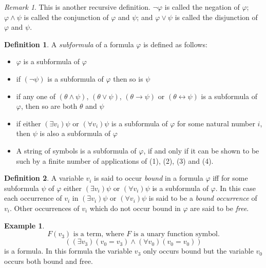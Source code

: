 \documentclass[titlepage, oneside]{amsbook}
\theoremstyle{plain}
\theoremstyle{definition}
\newtheorem{examples}{Example}
\newtheorem{definition}{Definition}
\theoremstyle{remark}
\newtheorem*{rem}{Remark}
\begin{document}
\begin{rem} This is another recursive definition. $\neg \varphi$ is
called the negation of $\varphi$;  $\varphi \wedge \psi$ is called the
conjunction of $\varphi$ and $\psi$; and  $\varphi \vee \psi$ is called the
disjunction of $\varphi $ and $\psi$.
\end{rem}

\begin{definition}\label{D:subform}
%
A \emph{subformula} of a formula $ \varphi$ is defined as follows:

\begin{itemize}
\item[(1)] $\varphi$ is a subformula of $ \varphi$
\item[(2)] if $ (\neg \psi )$ is a subformula of $ \varphi$ then so is
$\psi$
\item[(3)] if any one of $ (\theta \wedge \psi)$, $(\theta \vee \psi)$,
$(\theta \to \psi)$ or $(\theta \leftrightarrow \psi )$ is a subformula of $
\varphi$,
then so are both $\theta$ and $ \psi $
\item[(4)] if either $( \exists v_{i} ) \psi$ or $( \forall v_{i} ) \psi$ 
is a subformula of $\varphi$ for some natural number $i$, then $\psi$ is 
also a subformula of $\varphi$
\item[(5)] A string of symbols is a subformula of $\varphi$, if and only 
if it can be shown to be such by a finite number of applications of (1), (2),
(3) and (4).

\end{itemize}
\end{definition}


\begin{definition}\label{D:bound}
%
%
A variable $v_{i}$  is said to occur \emph{bound} in a formula $\varphi$ 
iff for some subformula $\psi$ of $\varphi$ either $(\exists v_{i}) \psi$ 
or $(\forall v_{i}) \psi $ is a subformula of $\varphi$.
In this case each occurrence of $v_{i}$  in $(\exists v_{i}) \psi$ or 
$(\forall v_{i}) \psi$ is said to be a 
\emph{bound occurrence} of $v_{i}$.
Other occurrences of $v_{i}$ which do not occur bound  in $\varphi$  are
said to be
\emph{free}.
\end{definition}

\begin{examples}\label{X:term} 
\[ F(v_3) \mbox{ is a term, where $F$ is a unary function symbol.} \]
\[ ((\exists v_3 ) ( v_0 = v_3 ) \wedge (\forall v_0 ) (v_0 = v_0 )) \] 
is a formula.  In this formula the variable $v_3$ only occurs bound but the variable $v_0$ occurs both bound and free.
\end{examples}
\end{document}
